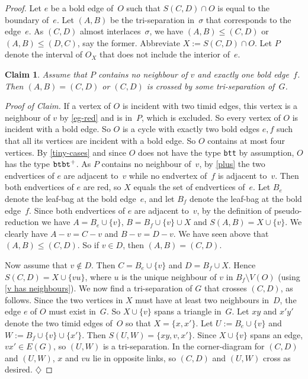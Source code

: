 \documentclass{aic}
\newenvironment{cproof}{\noindent\textit{Proof of Claim.}}{\phantom{!}\!\hfill$\diamondsuit$}
\theoremstyle{plain}
\newtheorem{sublem}{Claim}[thm]
\theoremstyle{definition}
\theoremstyle{plain}
\theoremstyle{plain}
\newcommand{\sm}{\setminus}
\renewcommand{\leq}{\leqslant}
\renewcommand{\le}{\leqslant}
\newcommand{\ty}[1]{{\tt#1}}
\begin{document}
\begin{proof}
Let $e$ be a bold edge of~$O$ such that $S(C,D)\cap O$ is equal to the boundary of~$e$.
Let $(A,B)$ be the tri-separation in~$\sigma$ that corresponds to the edge~$e$. 
As $(C,D)$ almost interlaces~$\sigma$, we have $(A,B)\leq (C,D)$ or $(A,B)\leq (D,C)$, say the former. 
Abbreviate $X:=S(C,D)\cap O$. 
Let $P$ denote the interval of $O_X$ that does not include the interior of~$e$. 

\begin{sublem}\label{betterCalc}
    Assume that $P$ contains no neighbour of $v$ and exactly one bold edge~$f$. Then $(A,B)=(C,D)$ or $(C,D)$ is crossed by some tri-separation of~$G$.
\end{sublem}
\begin{cproof}
    If a vertex of $O$ is incident with two timid edges, this vertex is a neighbour of $v$ by \autoref{eg-red} and is in~$P$, which is excluded. So every vertex of $O$ is incident with a bold edge.
    So $O$ is a cycle with exactly two bold edges $e,f$ such that all its vertices are incident with a bold edge. So $O$ contains at most four vertices. 
    By \autoref{tiny-cases} and since $O$ does not have the type \ty{btt} by assumption, $O$ has the type $\ty{btbt}^+$. 
    As $P$ contains no neighbour of~$v$, by \autoref{plus} the two endvertices of $e$ are adjacent to~$v$ while no endvertex of~$f$ is adjacent to~$v$.
    Then both endvertices of $e$ are red, so $X$ equals the set of endvertices of~$e$.
    Let $B_e$ denote the leaf-bag at the bold edge~$e$, and let $B_f$ denote the leaf-bag at the bold edge~$f$.
    Since both endvertices of $e$ are adjacent to~$v$, by the definition of pseudo-reduction we have $A=B_e\cup\{v\}$, $B=B_f\cup\{v\}\cup X$ and $S(A,B)=X\cup\{v\}$.
    We clearly have $A-v=C-v$ and $B-v=D-v$.
    We have seen above that $(A,B)\le (C,D)$.
    So if $v\in D$, then $(A,B)=(C,D)$.

    Now assume that $v\notin D$.
    Then $C=B_e\cup\{v\}$ and $D=B_f\cup X$.
    Hence $S(C,D)=X\cup\{vu\}$, where $u$ is the unique neighbour of $v$ in $B_f\sm V(O)$ (using \autoref{v has neighbours}).
    We now find a tri-separation of $G$ that crosses $(C,D)$, as follows.
    Since the two vertices in $X$ must have at least two neighbours in~$D$, the edge $e$ of $O$ must exist in~$G$.
    So $X\cup\{v\}$ spans a triangle in~$G$.
    Let $xy$ and $x'y'$ denote the two timid edges of~$O$ so that $X=\{x,x'\}$.
    Let $U:=B_e\cup\{v\}$ and $W:=B_f\cup\{v\}\cup\{x'\}$.
    Then $S(U,W)=\{xy,v,x'\}$.
    Since $X\cup \{v\}$ spans an edge, $vx'\in E(G)$, so $(U,W)$ is a tri-separation.
    In the corner-diagram for $(C,D)$ and $(U,W)$, $x$ and $vu$ lie in opposite links, so $(C,D)$ and $(U,W)$ cross as desired.
\end{cproof}


\end{proof}
\end{document}
